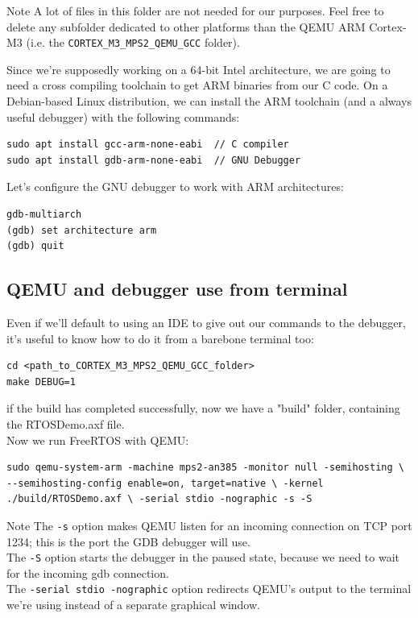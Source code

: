 \documentclass[10pt]{article}
\begin{document}
\begin{example}{Note}
    A lot of files in this folder are not needed for our purposes. Feel free to delete any subfolder dedicated to other platforms than the QEMU ARM Cortex-M3 (i.e. the \verb|CORTEX_M3_MPS2_QEMU_GCC| folder).
\end{example}

Since we're supposedly working on a 64-bit Intel architecture, we are going to need a cross compiling toolchain to get ARM binaries from our C code. On a Debian-based Linux distribution, we can install the ARM toolchain (and a always useful debugger) with the following commands:
\begin{lstlisting}
sudo apt install gcc-arm-none-eabi  // C compiler
sudo apt install gdb-arm-none-eabi  // GNU Debugger
\end{lstlisting}

Let's configure the GNU debugger to work with ARM architectures:
\begin{lstlisting}
gdb-multiarch
(gdb) set architecture arm
(gdb) quit
\end{lstlisting}
\subsection{QEMU and debugger use from terminal}
Even if we'll default to using an IDE to give out our commands to the debugger, it's useful to know how to do it from a barebone terminal too:
\begin{lstlisting}
cd <path_to_CORTEX_M3_MPS2_QEMU_GCC_folder>
make DEBUG=1
\end{lstlisting}
if the build has completed successfully, now we have a "build" folder, containing the RTOSDemo.axf file.\\
Now we run FreeRTOS with QEMU:
\begin{lstlisting}
sudo qemu-system-arm -machine mps2-an385 -monitor null -semihosting \ --semihosting-config enable=on, target=native \ -kernel ./build/RTOSDemo.axf \ -serial stdio -nographic -s -S
\end{lstlisting}

\begin{example}{Note}
    The \verb|-s| option makes QEMU listen for an incoming connection on TCP port 1234; this is the port the GDB debugger will use.\\
    The \verb|-S| option starts the debugger in the paused state, because we need to wait for the incoming gdb connection.\\
    The \verb|-serial stdio -nographic| option redirects QEMU's output to the terminal we're using instead of a separate graphical window.
\end{example}
\end{document}
